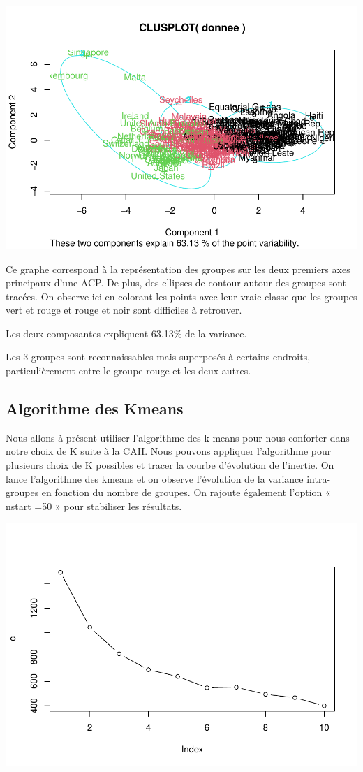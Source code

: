 \documentclass[
]{article}
\begin{document}
\includegraphics{Projet_files/figure-latex/unnamed-chunk-19-1.pdf}

Ce graphe correspond à la représentation des groupes sur les deux
premiers axes principaux d'une ACP. De plus, des ellipses de contour
autour des groupes sont tracées. On observe ici en colorant les points
avec leur vraie classe que les groupes vert et rouge et rouge et noir
sont difficiles à retrouver.

Les deux composantes expliquent 63.13\% de la variance.

Les 3 groupes sont reconnaissables mais superposés à certains endroits,
particulièrement entre le groupe rouge et les deux autres.

\hypertarget{algorithme-des-kmeans}{%
\subsection{Algorithme des Kmeans}\label{algorithme-des-kmeans}}

Nous allons à présent utiliser l'algorithme des k-means pour nous
conforter dans notre choix de K suite à la CAH. Nous pouvons appliquer
l'algorithme pour plusieurs choix de K possibles et tracer la courbe
d'évolution de l'inertie. On lance l'algorithme des kmeans et on observe
l'évolution de la variance intra-groupes en fonction du nombre de
groupes. On rajoute également l'option « nstart =50 » pour stabiliser
les résultats.

\includegraphics{Projet_files/figure-latex/unnamed-chunk-20-1.pdf}
\end{document}
